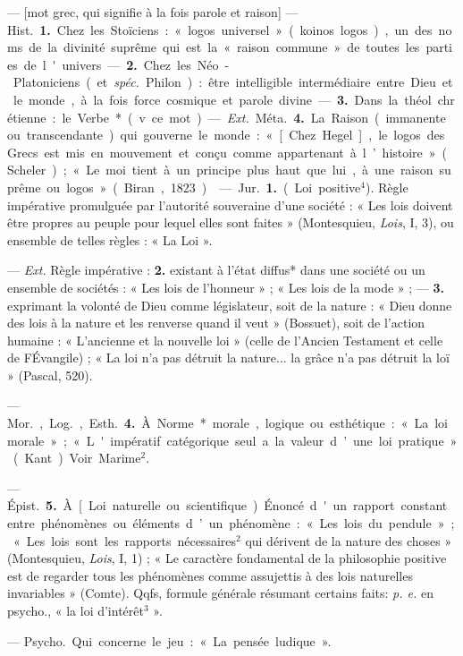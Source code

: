 \begin{itemize}[leftmargin=1cm, label=, itemsep=1pt]
 — [mot grec, qui signifie à la fois
parole et raison] — \si{Hist.} {\bf 1.} Chez
les Stoïciens : « logos universel »
(koinos logos), un des noms de la
divinité suprême qui est la « raison
commune » de toutes les parties de
l'univers. — {\bf 2.} Chez les Néo-Platoniciens (et {\it spéc.} Philon) : être intelligible intermédiaire entre Dieu et
le monde, à la fois force cosmique et
parole divine. — {\bf 3.} Dans la théol.
chrétienne : le Verbe* (v. ce mot).

— {\it Ext.} \si{Méta.} {\bf 4.} La Raison (immanente ou transcendante) qui
gouverne le monde : « [Chez Hegel],
le logos des Grecs est mis en mouvement et conçu comme appartenant à l’histoire » (Scheler) ; « Le
moi tient à un principe plus haut
que lui, à une raison suprême ou
logos » (Biran, 1823).

 — \si{Jur.} {\bf 1.} (Loi positive$^4$). Règle
impérative promulguée par l'autorité souveraine d’une société : « Les
lois doivent être propres au peuple
pour lequel elles sont faites » (Montesquieu, {\it Lois}, I, 3), ou ensemble de
telles règles : « La Loi ».

— {\it Ext.} Règle impérative : {\bf 2.} existant à l’état diffus* dans une société
ou un ensemble de sociétés : « Les
lois de l'honneur » ; « Les lois de la
mode » ; — {\bf 3.} exprimant la volonté
de Dieu comme législateur, soit de
la nature : « Dieu donne des lois à la
nature et les renverse quand il veut »
(Bossuet), soit de l'action humaine :
« L'ancienne et la nouvelle loi »
(celle de l'Ancien Testament et celle
de FÉvangile) ; « La loi n'a pas détruit la nature... la grâce n’a pas
détruit la loï » (Pascal, 520).

— \si{Mor.}, \si{Log.}, \si{Esth.} {\bf 4.} À Norme*
morale, logique ou esthétique : « La
loi morale » ; « L'impératif catégorique seul a la valeur d’une loi pratique » (Kant). Voir Marime$^2$.

— \si{Épist.} {\bf 5.} À [Loi naturelle ou
scientifique). Énoncé d'un rapport
constant entre phénomènes ou éléments d’un phénomène : « Les lois
du pendule » ; « Les lois sont les rapports nécessaires$^2$ qui dérivent de la
nature des choses » (Montesquieu,
{\it Lois}, I, 1) ; « Le caractère fondamental de la philosophie positive
est de regarder tous les phénomènes
comme assujettis à des lois naturelles invariables » (Comte). Qqfs,
formule générale résumant certains
faits: {\it p. e.} en psycho., « la loi d’intérêt$^3$ ».

 — \si{Psycho.} Qui concerne le
jeu : « La pensée ludique ».


\end{itemize}
